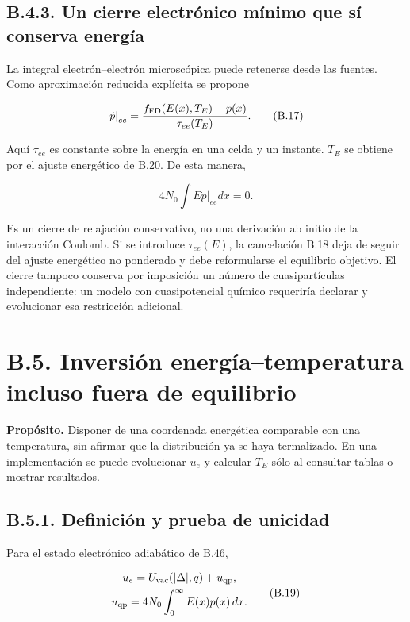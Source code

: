 \documentclass[
  spanish,
  10pt,
  a4paper,
]{article}
\begin{document}
\subsection{B.4.3. Un cierre electrónico mínimo que sí conserva
energía}\label{b.4.3.-un-cierre-electruxf3nico-muxednimo-que-suxed-conserva-energuxeda}

La integral electrón--electrón microscópica puede retenerse desde las
fuentes. Como aproximación reducida explícita se propone

\[
\left.\dot p\right|_{ee}
=\frac{f_{\rm FD}(E(x),T_E)-p(x)}{\tau_{ee}(T_E)}. \tag{B.17}
\]

Aquí \(\tau_{ee}\) es constante sobre la energía en una celda y un
instante. \(T_E\) se obtiene por el ajuste energético de B.20. De esta
manera,

\[
4N_0\int E\left.\dot p\right|_{ee}dx=0. \tag{B.18}
\]

Es un cierre de relajación conservativo, no una derivación ab initio de
la interacción Coulomb. Si se introduce \(\tau_{ee}(E)\), la cancelación
B.18 deja de seguir del ajuste energético no ponderado y debe
reformularse el equilibrio objetivo. El cierre tampoco conserva por
imposición un número de cuasipartículas independiente: un modelo con
cuasipotencial químico requeriría declarar y evolucionar esa restricción
adicional.

\section{B.5. Inversión energía--temperatura incluso fuera de
equilibrio}\label{b.5.-inversiuxf3n-energuxedatemperatura-incluso-fuera-de-equilibrio}

\textbf{Propósito.} Disponer de una coordenada energética comparable con
una temperatura, sin afirmar que la distribución ya se haya termalizado.
En una implementación se puede evolucionar \(u_e\) y calcular \(T_E\)
sólo al consultar tablas o mostrar resultados.

\subsection{B.5.1. Definición y prueba de
unicidad}\label{b.5.1.-definiciuxf3n-y-prueba-de-unicidad}

Para el estado electrónico adiabático de B.46,

\[
\begin{gathered}
u_e=U_{\rm vac}(|\Delta|,q)+u_{\rm qp},\\
u_{\rm qp}=4N_0\int_0^\infty E(x)p(x)\,dx.
\end{gathered} \tag{B.19}
\]
\end{document}

